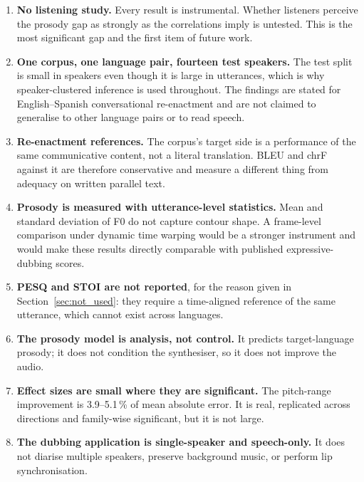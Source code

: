 \begin{enumerate}
  \item \textbf{No listening study.} Every result is instrumental. Whether listeners perceive the
        prosody gap as strongly as the correlations imply is untested. This is the most significant
        gap and the first item of future work.
  \item \textbf{One corpus, one language pair, fourteen test speakers.} The test split is small in
        speakers even though it is large in utterances, which is why speaker-clustered inference is
        used throughout. The findings are stated for English--Spanish conversational re-enactment
        and are not claimed to generalise to other language pairs or to read speech.
  \item \textbf{Re-enactment references.} The corpus's target side is a performance of the same
        communicative content, not a literal translation. BLEU and chrF against it are therefore
        conservative and measure a different thing from adequacy on written parallel text.
  \item \textbf{Prosody is measured with utterance-level statistics.} Mean and standard deviation of
        F0 do not capture contour shape. A frame-level comparison under dynamic time warping would
        be a stronger instrument and would make these results directly comparable with published
        expressive-dubbing scores.
  \item \textbf{PESQ and STOI are not reported}, for the reason given in
        Section~\ref{sec:not_used}: they require a time-aligned reference of the same utterance,
        which cannot exist across languages.
  \item \textbf{The prosody model is analysis, not control.} It predicts target-language prosody;
        it does not condition the synthesiser, so it does not improve the audio.
  \item \textbf{Effect sizes are small where they are significant.} The pitch-range improvement is
        3.9--5.1\,\% of mean absolute error. It is real, replicated across directions and
        family-wise significant, but it is not large.
  \item \textbf{The dubbing application is single-speaker and speech-only.} It does not diarise
        multiple speakers, preserve background music, or perform lip synchronisation.
\end{enumerate}
